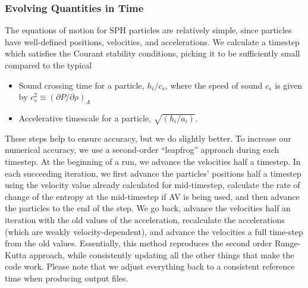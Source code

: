 \subsubsection{Evolving Quantities in Time}
\label{nm:sph:ev}
The equations of motion for SPH particles are relatively simple, since
particles have well-defined positions, velocities, and accelerations.
We calculate a timestep which satisfies the Courant stability
conditions, picking it to be sufficiently small compared to the
typical
\begin{itemize}
\item Sound crossing time for a particle, $h_i/c_s$, where the speed of
sound $c_s$ is given by $c_s^2\equiv (\partial P/\partial\rho)_A$
\item Accelerative timescale for a particle, $\sqrt{(h_i/a_i)}$.
\end{itemize}

These steps help to ensure accuracy, but we do slightly better.  To
increase our numerical accuracy, we use a second-order ``leapfrog''
approach during each timestep.  At the beginning of a run, we advance
the velocities half a timestep.  In each succeeding iteration, we
first advance the particles' positions half a timestep using the
velocity value already calculated for mid-timestep, calculate the
rate of change of the entropy at the mid-timestep if AV is being
used, and then advance the particles to the end of the step. We go
back, advance the velocities half an iteration with the old values of
the acceleration, recalculate the accelerations (which are weakly
velocity-dependent), and advance the velocities a full time-step from
the old values.  Essentially, this method reproduces the second order
Runge-Kutta approach, while consistently updating all the other things
that make the code work. Please note that we adjust everything back
to a consistent reference time when producing output files. 

